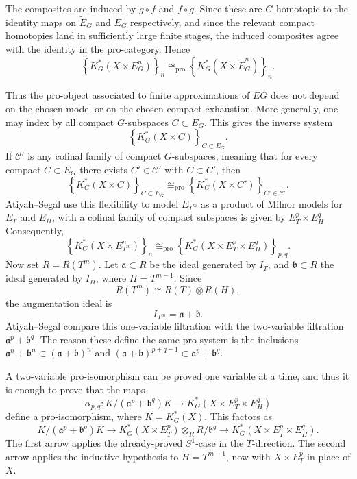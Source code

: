 \documentclass[12pt]{article}
\begin{document}
The composites are induced by $g\circ f$ and $f\circ g$. Since these are
$G$-homotopic to the identity maps on $\widetilde E_G$ and $E_G$ respectively,
and since the relevant compact homotopies land in sufficiently large finite
stages, the induced composites agree with the identity in the pro-category.
Hence
\[
    \left\{K_G^*(X\times E_G^n)\right\}_n
    \cong_{\mathrm{pro}}
    \left\{K_G^*(X\times \widetilde E_G^n)\right\}_n.
\]

Thus the pro-object associated to finite approximations of $EG$ does not
depend on the chosen model or on the chosen compact exhaustion. More generally, one may index by all compact $G$-subspaces $C\subset E_G$.
This gives the inverse system
\[
    \left\{K_G^*(X\times C)\right\}_{C\subset E_G}.
\]
If $\mathcal C'$ is any cofinal family of compact $G$-subspaces, meaning that
for every compact $C\subset E_G$ there exists $C'\in \mathcal C'$ with
$C\subset C'$, then
\[
    \left\{K_G^*(X\times C)\right\}_{C\subset E_G}
    \cong_{\mathrm{pro}}
    \left\{K_G^*(X\times C')\right\}_{C'\in\mathcal C'}.
\]
Atiyah--Segal use this flexibility to model $E_{T^m}$ as a product of Milnor models for $E_T$ and $E_H$, with a cofinal family of compact subspaces is given by $E_T^p\times E_H^q$
Consequently,
\[
    \left\{
        K_G^*(X\times E_{T^m}^n)
    \right\}_n
    \cong_{\mathrm{pro}}
    \left\{
        K_G^*(X\times E_T^p\times E_H^q)
    \right\}_{p,q}.
\]
Now set $R=R(T^m)$. Let $\mathfrak a\subset R$ be the ideal generated by $I_T$, and
$\mathfrak b\subset R$ the ideal generated by $I_H$, where $H=T^{m-1}$. Since
\[
R(T^m)\cong R(T)\otimes R(H),
\]
the augmentation ideal is
\[
I_{T^m}=\mathfrak a+\mathfrak b.
\]
Atiyah--Segal compare this one-variable filtration with the two-variable filtration
$\mathfrak a^p+\mathfrak b^q$.
The reason these define the same pro-system is the inclusions
$\mathfrak a^n+\mathfrak b^n \subset (\mathfrak a+\mathfrak b)^n$
and $(\mathfrak a+\mathfrak b)^{p+q-1} \subset \mathfrak a^p+\mathfrak b^q$.

A two-variable pro-isomorphism can be proved one variable at a time, and thus it is enough to prove that the maps
\[
\alpha_{p,q}:
K/(\mathfrak a^p+\mathfrak b^q)K
\longrightarrow
K_G^*(X\times E_T^p\times E_H^q)
\]
define a pro-isomorphism, where $K=K_G^*(X)$. This factors as
\[
K/(\mathfrak a^p+\mathfrak b^q)K
\longrightarrow
K_G^*(X\times E_T^p)\otimes_R R/\mathfrak b^q
\longrightarrow
K_G^*(X\times E_T^p\times E_H^q).
\]
The first arrow applies the already-proved $S^1$-case in the $T$-direction. The second
arrow applies the inductive hypothesis to $H=T^{m-1}$, now with $X\times E_T^p$ in place
of $X$.
\end{document}
